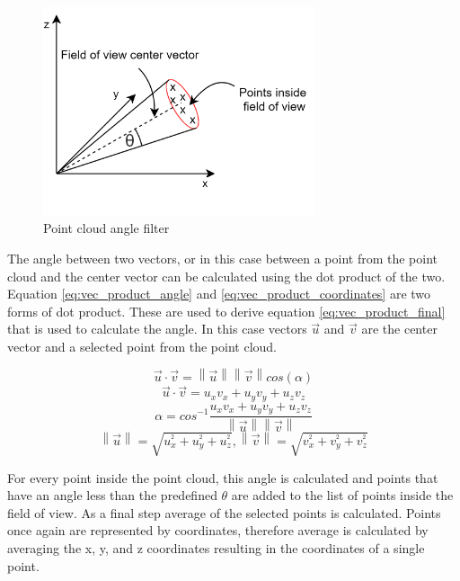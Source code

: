 \begin{figure}[!ht]
    \centering
    \includegraphics[width=80mm, keepaspectratio]{figures/data_angle_filter.png}
    \caption{Point cloud angle filter}
    \label{fig:data_angle_filter}
\end{figure}


The angle between two vectors, or in this case between a point from the point cloud and the center vector
can be calculated using the dot product of the two. Equation \ref{eq:vec_product_angle} and
\ref{eq:vec_product_coordinates} are two forms of dot product. These are used to derive equation
\ref{eq:vec_product_final} that is used to calculate the angle. In this case vectors $\vec{u}$ and
$\vec{v}$ are the center vector and a selected point from the point cloud.


\begin{equation} \label{eq:vec_product_angle}
    \vec{u}\cdot\vec{v}=\left\|\vec{u}\right\|\left\|\vec{v}\right\|cos(\alpha)
\end{equation}
\begin{equation} \label{eq:vec_product_coordinates}
    \vec{u}\cdot\vec{v}=u_{x}v_{x}+u_{y}v_{y}+u_{z}v_{z}
\end{equation}
\begin{equation} \label{eq:vec_product_final}
    \alpha = cos^{-1}\frac{u_{x}v_{x}+u_{y}v_{y}+u_{z}v_{z}}{\left\|\vec{u}\right\|\left\|\vec{v}\right\|}
\end{equation}
\begin{equation} \label{eq:vec_length}
\left\|\vec{u}\right\| = \sqrt{u_{x}^{^{2}}+u_{y}^{^{2}}+u_{z}^{^{2}}}, \left\|\vec{v}\right\| = \sqrt{v_{x}^{^{2}}+v_{y}^{^{2}}+v_{z}^{^{2}}}
\end{equation}

For every point inside the point cloud, this angle is calculated and points that have an angle less than the
predefined $\theta$ are added to the list of points inside the field of view. As a final step average of the
selected points is calculated. Points once again are represented by coordinates, therefore average is calculated
by averaging the x, y, and z coordinates resulting in the coordinates of a single point.

